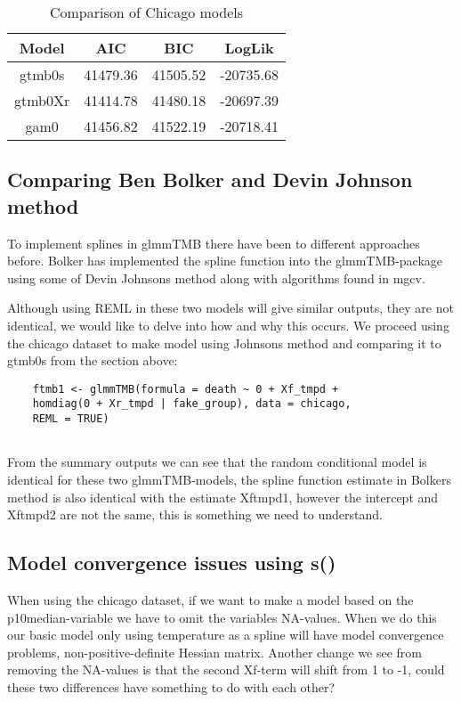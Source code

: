 \begin{table}[h]
\centering
\caption{Comparison of Chicago models}
\label{table:further_model_comparison}
\begin{tabular}{|c|c|c|c|}
\hline
Model & AIC & BIC & LogLik \\
\hline
gtmb0s & 41479.36 & 41505.52 & -20735.68 \\
\hline
gtmb0Xr & 41414.78 & 41480.18 & -20697.39 \\
\hline
gam0 & 41456.82 & 41522.19 & -20718.41 \\
\hline
\end{tabular}
\end{table}


\subsection{Comparing Ben Bolker and Devin Johnson method }

To implement splines in glmmTMB there have been to different approaches before. Bolker has implemented the spline function into the glmmTMB-package using some of Devin Johnsons method along with algorithms found in mgcv.

Although using REML in these two models will give similar outputs, they are not identical,  we would like to delve into how and why this occurs. We proceed using the chicago dataset to make model using Johnsons method and comparing it to gtmb0s from the section above:


\begin{verbatim}
    ftmb1 <- glmmTMB(formula = death ~ 0 + Xf_tmpd + 
    homdiag(0 + Xr_tmpd | fake_group), data = chicago,
    REML = TRUE)
        
\end{verbatim}


From the summary outputs we can see that the random conditional model is identical for these two glmmTMB-models, the spline function estimate in Bolkers method is also identical with the estimate Xftmpd1, however the intercept and Xftmpd2 are not the same, this is something we need to understand.




\subsection{Model convergence issues using s()}

When using the chicago dataset, if we want to make a model based on the p10median-variable we have to omit the variables NA-values. When we do this our basic model only using temperature as a spline will have model convergence problems, non-positive-definite Hessian matrix. Another change we see from removing the NA-values is that the second Xf-term will shift from 1 to -1, could these two differences have something to do with each other?





